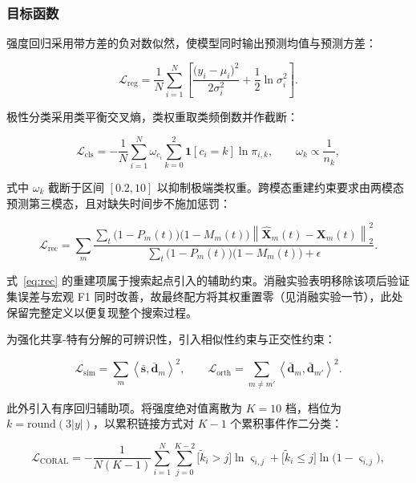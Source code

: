 \documentclass[withoutpreface,bwprint]{cumcmthesis}
\begin{document}
\subsubsection{目标函数}

强度回归采用带方差的负对数似然，使模型同时输出预测均值与预测方差：

\begin{equation}
\mathcal{L}_{\mathrm{reg}}=\frac{1}{N}\sum_{i=1}^{N}
\left[\frac{\big(y_i-\mu_i\big)^2}{2\sigma_i^2}+\frac{1}{2}\ln\sigma_i^2\right].
\label{eq:nll}
\end{equation}

极性分类采用类平衡交叉熵，类权重取类频倒数并作截断：

\begin{equation}
\mathcal{L}_{\mathrm{cls}}=-\frac{1}{N}\sum_{i=1}^{N}
\omega_{c_i}\sum_{k=0}^{2}\mathbf{1}\!\left[c_i=k\right]\ln\pi_{i,k},\qquad
\omega_k\propto\frac{1}{n_k},
\label{eq:ce}
\end{equation}

式中 $\omega_k$ 截断于区间 $[0.2,10]$ 以抑制极端类权重。跨模态重建约束要求由两模态预测第三模态，且对缺失时间步不施加惩罚：

\begin{equation}
\mathcal{L}_{\mathrm{rec}}=\sum_{m}\frac{\sum_{t}\big(1-P_m(t)\big)\big(1-M_m(t)\big)
\left\|\hat{\bm{X}}_m(t)-\bm{X}_m(t)\right\|_2^2}
{\sum_{t}\big(1-P_m(t)\big)\big(1-M_m(t)\big)+\epsilon}.
\label{eq:rec}
\end{equation}

式~\eqref{eq:rec} 的重建项属于搜索起点引入的辅助约束。消融实验表明移除该项后验证集误差与宏观 F1 同时改善，故最终配方将其权重置零（见消融实验一节），此处保留完整定义以便复现整个搜索过程。

为强化共享-特有分解的可辨识性，引入相似性约束与正交性约束：

\begin{equation}
\mathcal{L}_{\mathrm{sim}}=\sum_{m}\left\langle\bar{\bm{s}},\bar{\bm{d}}_m\right\rangle^{2},
\qquad
\mathcal{L}_{\mathrm{orth}}=\sum_{m\ne m'}\left\langle\bar{\bm{d}}_m,
\bar{\bm{d}}_{m'}\right\rangle^{2}.
\label{eq:simorth}
\end{equation}

此外引入有序回归辅助项。将强度绝对值离散为 $K=10$ 档，档位为 $k=\mathrm{round}(3|y|)$，以累积链接方式对 $K-1$ 个累积事件作二分类：

\begin{equation}
\mathcal{L}_{\mathrm{CORAL}}=-\frac{1}{N(K-1)}\sum_{i=1}^{N}\sum_{j=0}^{K-2}
\Big[\tilde{k}_i>j\Big]\ln\varsigma_{i,j}+\Big[\tilde{k}_i\le j\Big]\ln\big(1-\varsigma_{i,j}\big),
\label{eq:coral}
\end{equation}
\end{document}
